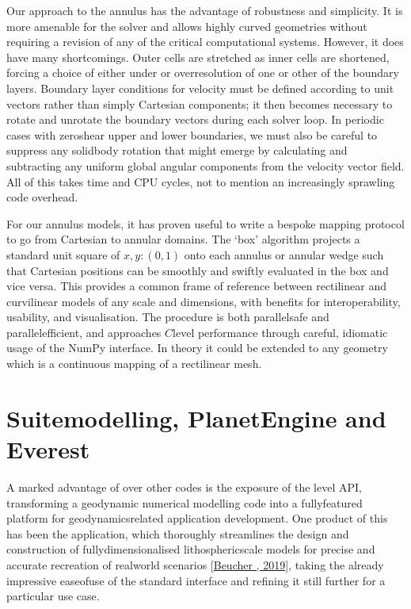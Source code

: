 \documentclass[letterpaper,10pt,english]{jupyterBook}
\begin{document}
\sphinxAtStartPar
Our approach to the annulus has the advantage of robustness and simplicity. It is more amenable for the solver and allows highly curved geometries without requiring a revision of any of the critical computational systems. However, it does have many shortcomings. Outer cells are stretched as inner cells are shortened, forcing a choice of either under\sphinxhyphen{} or over\sphinxhyphen{}resolution of one or other of the boundary layers. Boundary layer conditions for velocity must be defined according to unit vectors rather than simply Cartesian components; it then becomes necessary to rotate and unrotate the boundary vectors during each solver loop. In periodic cases with zero\sphinxhyphen{}shear upper and lower boundaries, we must also be careful to suppress any solid\sphinxhyphen{}body rotation that might emerge by calculating and subtracting any uniform global angular components from the velocity vector field. All of this takes time and CPU cycles, not to mention an increasingly sprawling code overhead.

\sphinxAtStartPar
For our annulus models, it has proven useful to write a bespoke mapping protocol to go from Cartesian to annular domains. The ‘box’ algorithm projects a standard unit square of \(x,y:(0,1)\) onto each annulus or annular wedge such that Cartesian positions can be smoothly and swiftly evaluated in the box and vice versa. This provides a common frame of reference between rectilinear and curvilinear models of any scale and dimensions, with benefits for interoperability, usability, and visualisation. The procedure is both parallel\sphinxhyphen{}safe and parallel\sphinxhyphen{}efficient, and approaches \(C\)\sphinxhyphen{}level performance through careful, idiomatic usage of the NumPy interface. In theory it could be extended to any geometry which is a continuous mapping of a rectilinear mesh.


\section{Suite\sphinxhyphen{}modelling, PlanetEngine and Everest}
\label{\detokenize{content/chapter_02_methods/section3:suite-modelling-planetengine-and-everest}}\label{\detokenize{content/chapter_02_methods/section3::doc}}
\sphinxAtStartPar
A marked advantage of  over other codes is the exposure of the \sphinxhyphen{}level API, transforming a geodynamic numerical modelling code into a fully\sphinxhyphen{}featured platform for geodynamics\sphinxhyphen{}related application development. One product of this has been the  application, which thoroughly streamlines the design and construction of fully\sphinxhyphen{}dimensionalised lithospheric\sphinxhyphen{}scale models for precise and accurate recreation of real\sphinxhyphen{}world scenarios {[}\hyperlink{cite.references:id670}{Beucher , 2019}{]}, taking the already impressive ease\sphinxhyphen{}of\sphinxhyphen{}use of the standard  interface and refining it still further for a particular use case.
\end{document}
